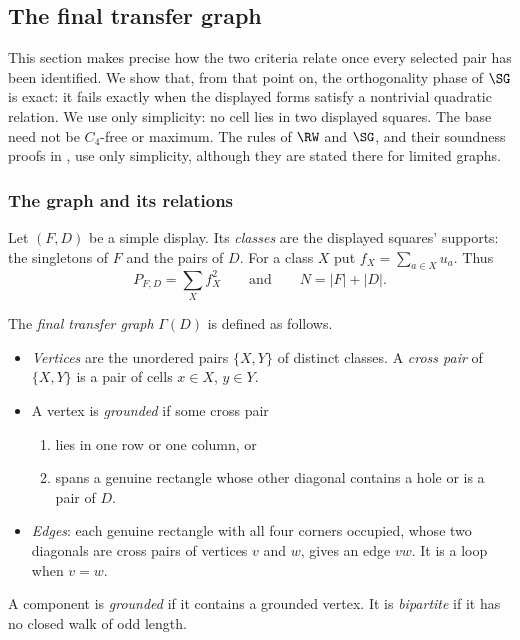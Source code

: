 \subsection{The final transfer graph}\label{sec:transfer-graph}

This section makes precise how the two criteria relate once every selected
pair has been identified. We show that, from that point on, the orthogonality
phase of $\SG$ is exact: it fails exactly when the displayed forms satisfy a
nontrivial quadratic relation. We use only simplicity: no cell lies in two
displayed squares. The base need not be $C_4$-free or maximum. The rules of
$\RW$ and $\SG$, and their soundness proofs in \cite{LQ}, use only
simplicity, although they are stated there for limited graphs.

\subsubsection{The graph and its relations}

Let $(F,D)$ be a simple display. Its \emph{classes} are the displayed
squares' supports: the singletons of $F$ and the pairs of $D$. For a
class $X$ put $f_X=\sum_{a\in X}u_a$. Thus
\[
 P_{F,D}=\sum_X f_X^2 \qquad\text{and}\qquad N=|F|+|D|.
\]

\begin{definition}\label{def:final-graph}
The \emph{final transfer graph} $\Gamma(D)$ is defined as follows.
\begin{itemize}
\item \emph{Vertices} are the unordered pairs $\{X,Y\}$ of distinct
      classes. A \emph{cross pair} of $\{X,Y\}$ is a pair of cells
      $x\in X$, $y\in Y$.
\item A vertex is \emph{grounded} if some cross pair
      \begin{enumerate}[label=(\roman*)]
      \item lies in one row or one column, or
      \item spans a genuine rectangle whose other diagonal contains a
            hole or is a pair of $D$.
      \end{enumerate}
\item \emph{Edges}: each genuine rectangle with all four corners occupied,
      whose two diagonals are cross pairs of vertices $v$ and $w$, gives an
      edge $vw$. It is a loop when $v=w$.
\end{itemize}
A component is \emph{grounded} if it contains a grounded vertex. It is
\emph{bipartite} if it has no closed walk of odd length.
\end{definition}

